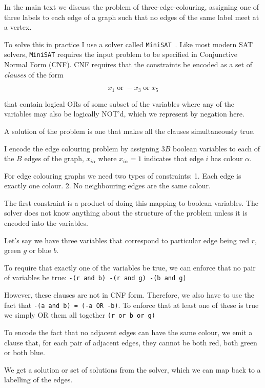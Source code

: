 In the main text we discuss the problem of three-edge-colouring, assigning one of three labels to each edge of a graph such that no edges of the same label meet at a vertex.

To solve this in practice I use a solver called \passthrough{\lstinline!MiniSAT!}~\autocite{imms-sat18}. Like most modern SAT solvers, \passthrough{\lstinline!MiniSAT!} requires the input problem to be specified in Conjunctive Normal Form (CNF). CNF requires that the constraints be encoded as a set of \emph{clauses} of the form

\[x_1 \;\textrm{or}\; -x_3 \;\textrm{or}\; x_5\]

that contain logical ORs of some subset of the variables where any of the variables may also be logically NOT'd, which we represent by negation here.

A solution of the problem is one that makes all the clauses simultaneously true.

I encode the edge colouring problem by assigning \(3B\) boolean variables to each of the \(B\) edges of the graph, \(x_{i\alpha}\) where \(x_{i\alpha} = 1\) indicates that edge \(i\) has colour \(\alpha\).

For edge colouring graphs we need two types of constraints: 1. Each edge is exactly one colour. 2. No neighbouring edges are the same colour.

The first constraint is a product of doing this mapping to boolean variables. The solver does not know anything about the structure of the problem unless it is encoded into the variables.

Let's say we have three variables that correspond to particular edge being red \(r\), green \(g\) or blue \(b\).

To require that exactly one of the variables be true, we can enforce that no pair of variables be true: \passthrough{\lstinline!-(r and b) -(r and g) -(b and g)!}

However, these clauses are not in CNF form. Therefore, we also have to use the fact that \passthrough{\lstinline!-(a and b) = (-a OR -b)!}. To enforce that at least one of these is true we simply OR them all together \passthrough{\lstinline!(r or b or g)!}

To encode the fact that no adjacent edges can have the same colour, we emit a clause that, for each pair of adjacent edges, they cannot be both red, both green or both blue.

We get a solution or set of solutions from the solver, which we can map back to a labelling of the edges.

